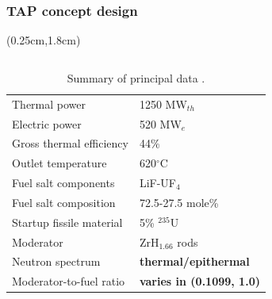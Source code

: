 \begin{frame}
\frametitle{TAP concept design}

\begin{textblock*}{12.7cm}(0.25cm,1.8cm) %
	
	\begin{columns}
		\column[t]{5cm}
		\vspace{+5mm}
		\begin{table}[h!]
			\fontsize{7}{9}\selectfont
			\caption{Summary of principal data
				\cite{transatomic_power_corporation_technical_2016}. }
			\vspace{-2mm}
			\begin{tabularx}{\textwidth}{ X  X }
				\hline
				Thermal power				           		& 1250 MW$_{th}  
				$       
				\\ 
				Electric power		                		& 520 MW$_e  
				$ 			 
				\\ 
				Gross thermal efficiency        			& 
				44\%     				 
				\\  
				Outlet temperature							& 
				620$^{\circ}$C         
				\\ 
				Fuel salt components                   & 
				LiF-UF$_4$				 \\  
				Fuel salt composition                  & 72.5-27.5 
				mole\%			 
				\\  
				Startup fissile material                     & 5\% 
				$^{235}$U          	 \\
				Moderator                              & ZrH$_{1.66}$ rods  \\
				Neutron spectrum						& 
				\textbf{thermal/epithermal}                 \\
				Moderator-to-fuel ratio						& 
				\textbf{varies in (0.1099, 1.0)}                 \\
				\hline
			\end{tabularx}
			\label{tab:tap_tab}
		\end{table}
		

\end{columns}
\end{textblock*}
\end{frame}
